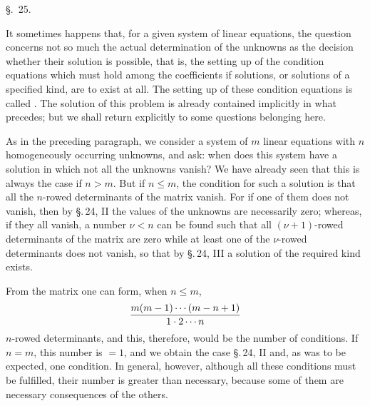 
\begin{center}
{\large \S.\ 25.}

\vspace{0.5em}
{\large{}}
\end{center}

It sometimes happens that, for a given system of linear equations, the question concerns not so much the actual determination of the unknowns as the decision whether their solution is possible, that is, the setting up of the condition equations which must hold among the coefficients if solutions, or solutions of a specified kind, are to exist at all. The setting up of these condition equations is called . The solution of this problem is already contained implicitly in what precedes; but we shall return explicitly to some questions belonging here.

As in the preceding paragraph, we consider a system of \(m\) linear equations with \(n\) homogeneously occurring unknowns, and ask: when does this system have a solution in which not all the unknowns vanish? We have already seen that this is always the case if \(n>m\). But if \(n\le m\), the  condition for such a solution is that all the \(n\)-rowed determinants of the matrix vanish. For if one of them does not vanish, then by \S.\,24, II the values of the unknowns are necessarily zero; whereas, if they all vanish, a number \(\nu<n\) can be found such that all \((\nu+1)\)-rowed determinants of the matrix are zero while at least one of the \(\nu\)-rowed determinants does not vanish, so that by \S.\,24, III a solution of the required kind exists.

From the matrix one can form, when \(n\le m\),
\[
        {m(m-1)\cdots(m-n+1)\over 1\cdot2\cdots n}
\]
\(n\)-rowed determinants, and this, therefore, would be the number of conditions. If \(n=m\), this number is \(=1\), and we obtain the case \S.\,24, II and, as was to be expected, one condition. In general, however, although all these conditions must be fulfilled, their number is greater than necessary, because some of them are necessary consequences of the others.
